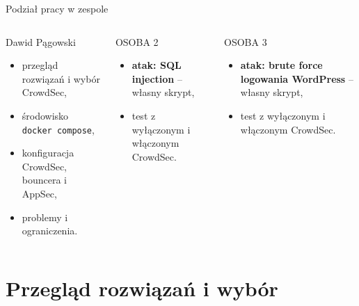 \documentclass[aspectratio=169,xcolor=dvipsnames]{beamer}
\begin{document}
\begin{frame}{Podział pracy w zespole}
    \begin{columns}[T]
        \begin{block}{Dawid Pągowski}
            \small
            \begin{itemize}
                \item przegląd rozwiązań i wybór CrowdSec,
                \item środowisko \texttt{docker compose},
                \item konfiguracja CrowdSec, bouncera i AppSec,
                \item problemy i ograniczenia.
            \end{itemize}
        \end{block}
        \begin{block}{OSOBA 2}
            \small
            \begin{itemize}
                \item \textbf{atak: SQL injection} -- własny skrypt,
                \item test z wyłączonym i włączonym CrowdSec.
            \end{itemize}
        \end{block}
        \begin{block}{OSOBA 3}
            \small
            \begin{itemize}
                \item \textbf{atak: brute force logowania WordPress} -- własny skrypt,
                \item test z wyłączonym i włączonym CrowdSec.
            \end{itemize}
        \end{block}
    \end{columns}
\end{frame}

\section{Przegląd rozwiązań i wybór}
\end{document}
